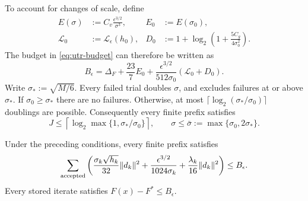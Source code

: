 \documentclass{article}
\begin{document}
To account for changes of scale, define
\begin{equation}\label{eq:utr-budget-parameters}
\begin{aligned}
 E(\sigma)&:=C_v\frac{\epsilon^{3/2}}{\sigma^3},
 &E_0&:=E(\sigma_0),\\
 \mathcal L_0&:=\mathcal L_\epsilon(h_0),
 &D_0&:=1+\log_2\left(1+\frac{5C_g}{4\sigma_0^2}\right).
\end{aligned}
\end{equation}
The budget in \eqref{eq:utr-budget} can therefore be written as
\[
 B_\epsilon=\Delta_F+\frac{23}{7}E_0+
                \frac{\epsilon^{3/2}}{512\sigma_0}
                   (\mathcal L_0+D_0).
\]
Write $\sigma_*:=\sqrt{M/6}$.  Every failed trial doubles $\sigma$,
and  excludes failures at or above $\sigma_*$.
If $\sigma_0\ge\sigma_*$ there are no failures.  Otherwise, at most
$\lceil\log_2(\sigma_*/\sigma_0)\rceil$ doublings are possible.
Consequently every finite prefix satisfies
\begin{equation}\label{eq:utr-inexact-scale-bound}
 J\le\left\lceil\log_2\max\{1,\sigma_*/\sigma_0\}\right\rceil,
 \qquad
 \sigma\le\bar\sigma:=\max\{\sigma_0,2\sigma_*\}.
\end{equation}

\begin{lemma}
\label{lem:utr-cumulative-budget}
Under the preceding conditions, every finite prefix satisfies
\begin{equation}\label{eq:utr-cumulative-budget}
 \sum_{\rm accepted}
 \left(\frac{\sigma_k\sqrt{h_k}}{32}\|d_k\|^2
       +\frac{\epsilon^{3/2}}{1024\sigma_k}
       +\frac{\lambda_k}{16}\|d_k\|^2\right)
 \le B_\epsilon.
\end{equation}
Every stored iterate satisfies $F(x)-F^*\le B_\epsilon$.
\end{lemma}
\end{document}

